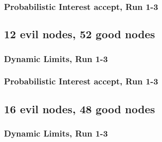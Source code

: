 \documentclass[onecolumn]{IEEEtran}
\begin{document}
\begin{minipage}[b]{\textwidth}

\end{minipage}

\clearpage

\subsubsection{Probabilistic Interest accept, Run 1-3}

\begin{minipage}[b]{\textwidth}

\end{minipage}

\clearpage
\subsection{\textbf{12 evil nodes}, 52 good nodes}

\subsubsection{Dynamic Limits, Run 1-3}

\begin{minipage}[b]{\textwidth}

\end{minipage}

\clearpage

\subsubsection{Probabilistic Interest accept, Run 1-3}

\begin{minipage}[b]{\textwidth}

\end{minipage}

\clearpage
\subsection{\textbf{16 evil nodes}, 48 good nodes}

\subsubsection{Dynamic Limits, Run 1-3}
\end{document}
